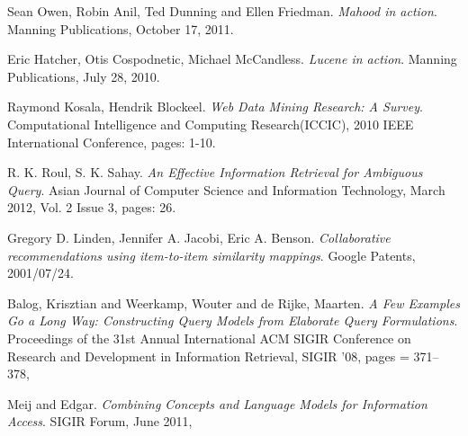 \begin{thebibliography}{99}
		Sean Owen, Robin Anil, Ted Dunning and Ellen Friedman.
		\emph{Mahood in action}.
		Manning Publications,
		October 17, 2011.


		Eric Hatcher, Otis Cospodnetic, Michael McCandless.
		\emph{Lucene in action}.
		Manning Publications,
		July 28, 2010.


		Raymond Kosala, Hendrik Blockeel.
		\emph{Web Data Mining Research: A Survey}.
		Computational Intelligence and Computing Research(ICCIC),
		2010 IEEE International Conference,
		pages: 1-10.

		R. K. Roul, S. K. Sahay.
		\emph{An Effective Information Retrieval for Ambiguous Query}.
		Asian Journal of Computer Science and Information Technology,
		March 2012,
		Vol. 2 Issue 3, 
		pages: 26.

		Gregory D. Linden, Jennifer A. Jacobi, Eric A. Benson.
		\emph{Collaborative recommendations using item-to-item similarity mappings}.
		Google Patents,
		2001/07/24.

		Balog, Krisztian and Weerkamp, Wouter and de Rijke, Maarten.
 		\emph{A Few Examples Go a Long Way: Constructing Query Models from Elaborate Query Formulations}.
 		Proceedings of the 31st Annual International ACM SIGIR Conference on Research and Development in Information Retrieval,
 		SIGIR '08,
		pages = {371--378},


		Meij and Edgar.
 		\emph{Combining Concepts and Language Models for Information Access}.
 		SIGIR Forum,
 		June 2011,



		\end{thebibliography}


